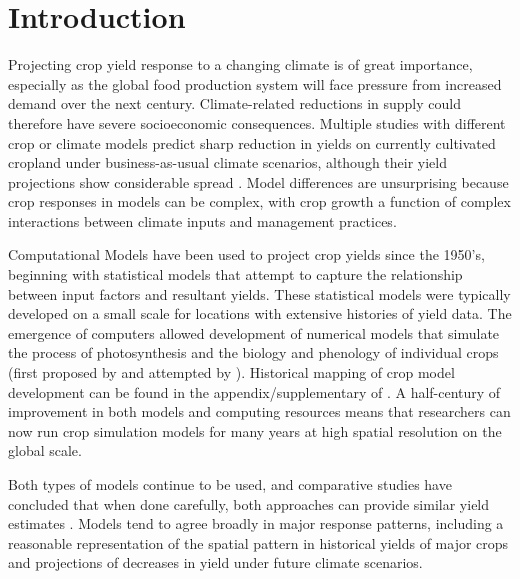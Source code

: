 \documentclass[preprint, 5p, times, twocolumn]{elsarticle}
\begin{document}
\modulolinenumbers[1]
\linenumbers
\section{Introduction}
\label{S:1}

Projecting crop yield response to a changing climate is of great importance, especially as the global food production system will face pressure from increased demand over the next century. Climate-related reductions in supply could therefore have severe socioeconomic consequences. Multiple studies with different crop or climate models predict sharp reduction in yields on currently cultivated cropland under {business-as-usual} climate scenarios, although their yield projections show considerable spread \citep[e.g.][and references therein]{porter2014, Rosenzweig2014, Schauberger2017}. Model differences are unsurprising because crop responses in models can be complex, with crop growth a function of complex interactions between climate inputs and management practices. 

Computational Models have been used to project crop yields since the 1950's, beginning with statistical models \citep{Heady57, Heady61} that attempt to capture the relationship between input factors and resultant yields. These statistical models were typically developed on a small scale for locations with extensive histories of yield data. The emergence of computers allowed development of numerical models that simulate the process of photosynthesis and the biology and phenology of individual crops (first proposed by \citet{wit58, Duncan67} and attempted by \citet{Duncan72}). Historical mapping of crop model development can be found in the appendix/supplementary of \citet{Rosenzweig2014}. A half-century of improvement in both models and computing resources means that researchers can now run crop simulation models for many years at high spatial resolution on the global scale. 

Both types of models continue to be used, and comparative studies have concluded that when done carefully, both approaches can provide similar yield estimates \citep[e.g.][]{Lobell2010, Moore2017, Roberts2017, zhao2017}. Models tend to agree broadly in major response patterns, including a reasonable representation of the spatial pattern in historical yields of major crops \citep[e.g.][]{Elliott2015, muller_global_2017} and projections of decreases in yield under future climate scenarios.
\end{document}
